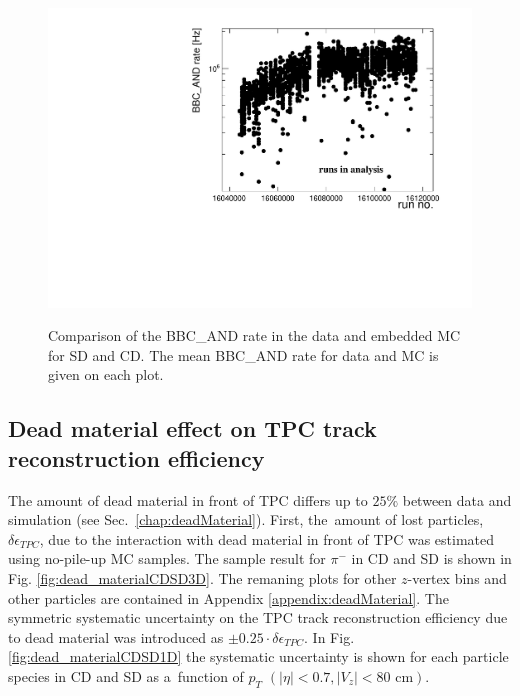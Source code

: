 \begin{figure}[H]
{	}
	\parbox{0.495\textwidth}{
		\centering
		\includegraphics[width=\linewidth,page=12]{graphics/systematicsEfficiency/bbc_and/Out.pdf}\\
	}
	\caption[Comparison of the BBC\_AND rate in the data  and   embedded MC for SD and CD.]{Comparison of the BBC\_AND rate in the data  and   embedded MC for SD and CD. The mean BBC\_AND rate for data and MC is given on each plot.}
	\label{fig:systErrorEmbDataRate}
\end{figure}


\newpage
\subsection{Dead material effect on TPC track reconstruction efficiency}\label{sec:deadMaterialSystematics}
The amount of dead material in front of TPC differs up to $25\%$ between data and simulation (see Sec.~\ref{chap:deadMaterial}). First, the~amount of lost particles, $\delta\epsilon_{ TPC}$, due to the interaction with dead material in front of TPC was estimated using  no-pile-up  MC samples. The sample result for $\pi^-$ in CD and SD is shown in Fig. \ref{fig:dead_materialCDSD3D}. The remaning plots for other $z$-vertex bins and other particles are contained  in Appendix \ref{appendix:deadMaterial}.
The symmetric systematic uncertainty on the TPC track reconstruction efficiency due to dead material was introduced as $\pm 0.25 \cdot\delta\epsilon_{ TPC}$.
In Fig. \ref{fig:dead_materialCDSD1D}  the systematic uncertainty is shown for each particle species in CD and SD as a~function of $p_T$ $\left(|\eta|<0.7, |V_{z}|<80 \text{ cm}\right)$. 

